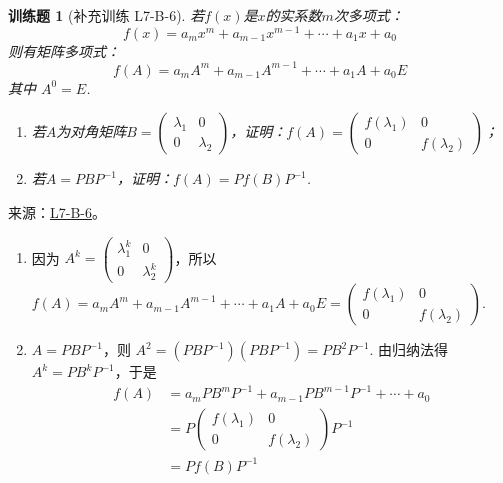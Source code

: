 \documentclass[UTF8,12pt,a4paper,fontset=fandol]{ctexart}
\newtheorem{exercise}{训练题}[section]
\begin{document}
\begin{exercise}[补充训练 L7-B-6]\label{prob:L7-B-6}
若$f(x)$是$x$的实系数$m$次多项式：
        \[f(x)=a_mx^m+a_{m-1}x^{m-1}+\cdots+a_1x+a_0\]
        则有矩阵多项式：
        \[f(A)=a_mA^m+a_{m-1}A^{m-1}+\cdots+a_1A+a_0E\]
        其中 $A^0=E$.
        \begin{enumerate}
            \item 若$A$为对角矩阵$B=\begin{pmatrix}
                          \lambda_1 & 0 \\ 0 & \lambda_2
                      \end{pmatrix}$，证明：$f(A)=\begin{pmatrix}
                          f(\lambda_1) & 0 \\ 0 & f(\lambda_2)
                      \end{pmatrix}$；

            \item 若$A=PBP^{-1}$，证明：$f(A)=Pf(B)P^{-1}$.
        \end{enumerate}
\end{exercise}
\noindent 来源：\href{https://github.com/yhwu-is/Linear-Algebra-Left-Undone/blob/new/%E8%AE%B2%E4%B9%89/%E4%B8%93%E9%A2%98/7%20%E7%BA%BF%E6%80%A7%E6%98%A0%E5%B0%84%E7%9F%A9%E9%98%B5%E8%A1%A8%E7%A4%BA%E4%B8%8E%E7%9F%A9%E9%98%B5%E8%BF%90%E7%AE%97%E5%9F%BA%E7%A1%80.tex}{L7-B-6}。
\begin{solve}
\begin{enumerate}
                \item 因为 $A^k=\begin{pmatrix}\lambda_1^k & 0 \\ 0 & \lambda_2^k\end{pmatrix}$，所以 $f(A)=a_mA^m+a_{m-1}A^{m-1}+\cdots+a_1A+a_0E = \begin{pmatrix}f(\lambda_1) & 0 \\ 0 & f(\lambda_2)\end{pmatrix}$.
                \item $A=PBP^{-1}$，则 $A^2=(PBP^{-1})(PBP^{-1})=PB^2P^{-1}$. 由归纳法得 $A^k=PB^kP^{-1}$，于是
                      \begin{align*}
                          f(A) & = a_mPB^mP^{-1}+a_{m-1}PB^{m-1}P^{-1}+\cdots+a_0                         \\
                               & =P\begin{pmatrix}f(\lambda_1) & 0 \\ 0 & f(\lambda_2)\end{pmatrix}P^{-1} \\
                               & =Pf(B)P^{-1}
                      \end{align*}
            \end{enumerate}
\end{solve}
\end{document}
